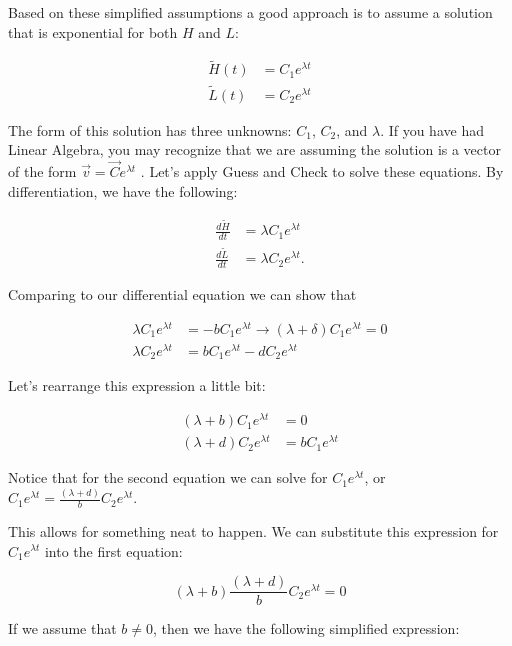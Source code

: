 \documentclass[
]{book}
\theoremstyle{definition}
\theoremstyle{definition}
\theoremstyle{definition}
\theoremstyle{remark}
\begin{document}
Based on these simplified assumptions a good approach is to assume a solution that is exponential for both \(H\) and \(L\):

\begin{align}
\tilde{H}(t) &= C_{1} e^{\lambda t} \\
\tilde{L}(t) &= C_{2} e^{\lambda t}
\end{align}

The form of this solution has three unknowns: \(C_{1}\), \(C_{2}\), and \(\lambda\). If you have had Linear Algebra, you may recognize that we are assuming the solution is a vector of the form \(\vec{v} = \vec{C} e^{\lambda t}\) . Let's apply Guess and Check to solve these equations. By differentiation, we have the following:

\begin{align}
\frac{d\tilde{H}}{dt} &= \lambda C_{1} e^{\lambda t} \\
\frac{d\tilde{L}}{dt}  &= \lambda C_{2} e^{\lambda t}.
\end{align}

Comparing to our differential equation we can show that

\begin{align}
\lambda C_{1} e^{\lambda t} &= - b C_{1} e^{\lambda t} \rightarrow  (\lambda +\delta) C_{1} e^{\lambda t} = 0\\
 \lambda C_{2} e^{\lambda t} &= b  C_{1} e^{\lambda t} - d C_{2} e^{\lambda t}
\end{align}

Let's rearrange this expression a little bit:

\begin{align}
 (\lambda + b) C_{1} e^{\lambda t} &= 0\\
 (\lambda + d) C_{2} e^{\lambda t} &=b  C_{1} e^{\lambda t}
\end{align}

Notice that for the second equation we can solve for \(C_{1} e^{\lambda t}\), or \(\displaystyle C_{1} e^{\lambda t} = \frac{(\lambda + d)}{b} C_{2} e^{\lambda t}\).

This allows for something neat to happen. We can substitute this expression for \(C_{1} e^{\lambda t}\) into the first equation:

\begin{equation}
 (\lambda + b) \frac{(\lambda + d)}{b} C_{2} e^{\lambda t} = 0
\end{equation}

If we assume that \(b \neq 0\), then we have the following simplified expression:
\end{document}
